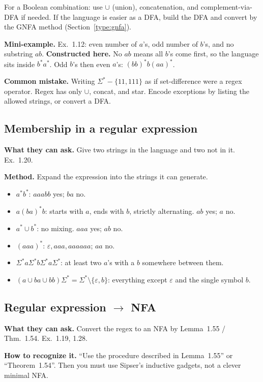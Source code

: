 \documentclass[11pt,a4paper]{article}
\newcommand{\eps}{\varepsilon}
\begin{document}
For a Boolean combination: use $\cup$ (union), concatenation, and
complement-via-DFA if needed. If the language is easier as a DFA,
build the DFA and convert by the GNFA method
(Section~\ref{type:gnfa}).

\textbf{Mini-example.}
Ex.~1.12: even number of $a$'s, odd number of $b$'s, and no substring
$ab$. \textbf{Constructed here.} No $ab$ means all $b$'s come first, so
the language sits inside $b^*a^*$. Odd $b$'s then even $a$'s:
$(bb)^*b(aa)^*$.

\textbf{Common mistake.}
Writing $\Sigma^*-\{11,111\}$ as if set-difference were a regex
operator. Regex has only $\cup$, concat, and star. Encode exceptions
by listing the allowed strings, or convert a DFA.

\subsection{Membership in a regular expression}
\label{type:re-member}

\textbf{What they can ask.}
Give two strings in the language and two not in it. Ex.~1.20.

\textbf{Method.}
Expand the expression into the strings it can generate.
\begin{itemize}[nosep]
  \item $a^*b^*$: $aaabb$ yes; $ba$ no.
  \item $a(ba)^*b$: starts with $a$, ends with $b$, strictly
        alternating. $ab$ yes; $a$ no.
  \item $a^*\cup b^*$: no mixing. $aaa$ yes; $ab$ no.
  \item $(aaa)^*$: $\eps,aaa,aaaaaa$; $aa$ no.
  \item $\Sigma^*a\Sigma^*b\Sigma^*a\Sigma^*$: at least two $a$'s with
        a $b$ somewhere between them.
  \item $(a\cup ba\cup bb)\Sigma^*=\Sigma^*\setminus\{\eps,b\}$:
        everything except $\eps$ and the single symbol $b$.
\end{itemize}

\subsection{Regular expression $\to$ NFA}
\label{type:re-nfa}

\textbf{What they can ask.}
Convert the regex to an NFA by Lemma~1.55 / Thm.~1.54. Ex.~1.19,
1.28.

\textbf{How to recognize it.}
``Use the procedure described in Lemma~1.55'' or ``Theorem~1.54''.
Then you must use Sipser's inductive gadgets, not a clever minimal
NFA.
\end{document}
